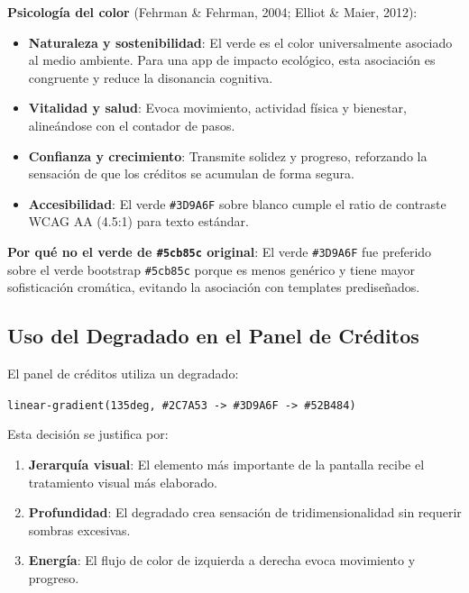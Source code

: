 \documentclass[12pt, a4paper]{article}
\begin{document}
\begin{justificacionbox}
\textbf{Psicología del color} (Fehrman \& Fehrman, 2004; Elliot \& Maier, 2012):

\begin{itemize}
  \item \textbf{Naturaleza y sostenibilidad}: El verde es el color universalmente asociado al medio ambiente. Para una app de impacto ecológico, esta asociación es congruente y reduce la disonancia cognitiva.
  \item \textbf{Vitalidad y salud}: Evoca movimiento, actividad física y bienestar, alineándose con el contador de pasos.
  \item \textbf{Confianza y crecimiento}: Transmite solidez y progreso, reforzando la sensación de que los créditos se acumulan de forma segura.
  \item \textbf{Accesibilidad}: El verde \texttt{\#3D9A6F} sobre blanco cumple el ratio de contraste WCAG AA (4.5:1) para texto estándar.
\end{itemize}

\textbf{Por qué no el verde de \texttt{\#5cb85c} original}:
El verde \texttt{\#3D9A6F} fue preferido sobre el verde bootstrap \texttt{\#5cb85c} porque es menos genérico y tiene mayor sofisticación cromática, evitando la asociación con templates prediseñados.
\end{justificacionbox}

\subsection{Uso del Degradado en el Panel de Créditos}

El panel de créditos utiliza un degradado:

\begin{center}
\texttt{linear-gradient(135deg, \#2C7A53 -> \#3D9A6F -> \#52B484)}
\end{center}

Esta decisión se justifica por:
\begin{enumerate}
  \item \textbf{Jerarquía visual}: El elemento más importante de la pantalla recibe el tratamiento visual más elaborado.
  \item \textbf{Profundidad}: El degradado crea sensación de tridimensionalidad sin requerir sombras excesivas.
  \item \textbf{Energía}: El flujo de color de izquierda a derecha evoca movimiento y progreso.
\end{enumerate}
\end{document}
